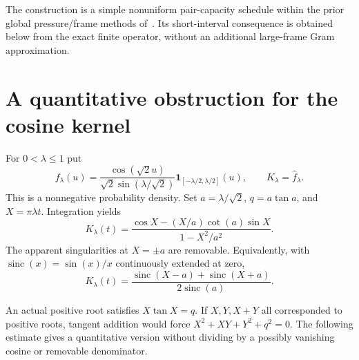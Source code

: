 \documentclass[11pt]{article}
\theoremstyle{remark}
\begin{document}
The construction is a simple nonuniform pair-capacity schedule within
the prior global pressure/frame methods of~\cite{Ainta,Trmdy,Tawan,Shi}.
Its short-interval consequence is obtained below from the exact finite
operator, without an additional large-frame Gram approximation.

\section{A quantitative obstruction for the cosine kernel}

For $0<\lambda\le1$ put
\begin{equation}\label{eq:density}
 f_\lambda(u)=\frac{\cos(\sqrt2u)}{\sqrt2\sin(\lambda/\sqrt2)}
       \mathbf1_{[-\lambda/2,\lambda/2]}(u),\qquad
 K_\lambda=\widehat f_\lambda.
\end{equation}
This is a nonnegative probability density. Set $a=\lambda/\sqrt2$,
$q=a\tan a$, and $X=\pi\lambda t$. Integration yields
\begin{equation}\label{eq:kernel}
 K_\lambda(t)=
 \frac{\cos X-(X/a)\cot(a)\sin X}{1-X^2/a^2}.
\end{equation}
The apparent singularities at $X=\pm a$ are removable. Equivalently,
with $\operatorname{sinc}(x)=\sin(x)/x$ continuously extended at zero,
\begin{equation}\label{eq:sinc}
 K_\lambda(t)=
 \frac{\operatorname{sinc}(X-a)+\operatorname{sinc}(X+a)}
      {2\operatorname{sinc}(a)}.
\end{equation}

An actual positive root satisfies $X\tan X=q$. If $X,Y,X+Y$ all
corresponded to positive roots, tangent addition would force
$X^2+XY+Y^2+q^2=0$. The following estimate gives a quantitative version
without dividing by a possibly vanishing cosine or removable denominator.
\end{document}
